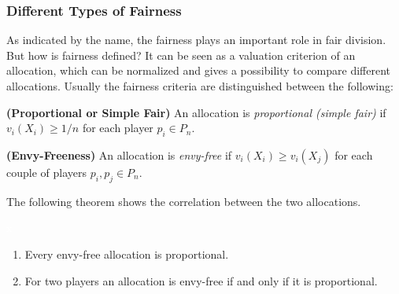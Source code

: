 \subsubsection{Different Types of Fairness}
As indicated by the name, the fairness plays an important role in fair division. But how is fairness defined? It can be seen as a valuation criterion of an allocation, which can be normalized and gives a possibility to compare different allocations. Usually the fairness criteria are distinguished between the following:
\begin{defi}{\textbf{(Proportional or Simple Fair)}}
\newline An allocation is \emph{proportional (simple fair)} if
$v_i(X_i) \geq 1/n$ for each player $p_i \in P_n$.
\end{defi}
\begin{defi}{\textbf{(Envy-Freeness)}}
\newline An allocation is \emph{envy-free} if $v_i(X_i) \geq
v_i(X_j)$ for each couple of players $p_i, p_j \in P_n$.
\end{defi}
\vsp
%
%
The following theorem shows the correlation between the two allocations.
%
\begin{lem}
\textcolor{white}{x}
\begin{enumerate}
\item Every envy-free allocation is proportional.
\item For two players an allocation is envy-free if and only if it is proportional.
\end{enumerate}
\end{lem}
